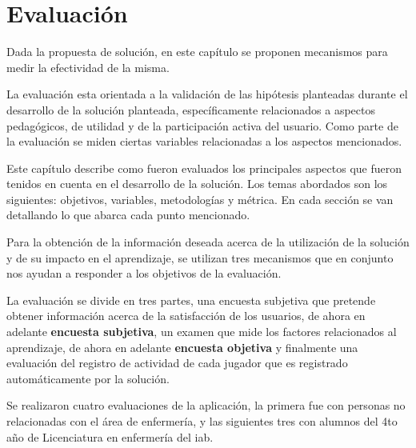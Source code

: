 \chapter{Evaluación}

Dada la propuesta de solución, en este capítulo se proponen mecanismos para medir la
efectividad de la misma.

La evaluación esta orientada a la validación de las hipótesis planteadas durante
el desarrollo de la solución planteada, específicamente relacionados a aspectos
pedagógicos, de utilidad y de la participación activa del usuario. Como parte de la 
evaluación se miden ciertas variables relacionadas a los aspectos mencionados.

Este capítulo describe como fueron evaluados los principales aspectos que fueron
tenidos en cuenta en el desarrollo de la solución. Los temas abordados son los siguientes:
objetivos, variables, metodologías y métrica. En cada sección se van detallando
lo que abarca cada punto mencionado.


Para la obtención de la información deseada acerca de la utilización de la
solución y de su impacto en el aprendizaje, se utilizan tres mecanismos que en
conjunto nos ayudan a responder a los objetivos de la evaluación.

La evaluación se divide en tres partes, una encuesta subjetiva que pretende
obtener información acerca de la satisfacción de los usuarios, de ahora en
adelante \textbf{encuesta subjetiva}, un examen que mide los factores
relacionados al aprendizaje, de ahora en adelante \textbf{encuesta objetiva}  y
finalmente una evaluación del registro de actividad de cada jugador que es
registrado automáticamente por la solución.


Se realizaron cuatro evaluaciones de la aplicación, la primera fue con personas
no relacionadas con el área de enfermería, y las siguientes tres con alumnos del
4to año de Licenciatura en enfermería del \Gls{iab}.






